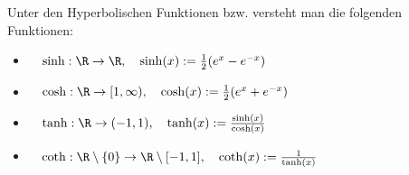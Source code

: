 Unter den Hyperbolischen Funktionen bzw.  versteht man die folgenden Funktionen:
\begin{itemize}[label={},leftmargin=*]
    \item {} $\quad \sinh : \R \to \R, \quad \sinh(x) := \frac{1}{2}(e^x-e^{-x})$
    \item {} $\quad \cosh : \R \to [1, \infty), \quad \cosh(x) := \frac{1}{2}(e^x+e^{-x})$
    \item {} $\quad \tanh : \R \to (-1, 1), \quad \tanh(x) := \frac{\sinh(x)}{\cosh(x)}$
    \item {} $\quad \coth : \R \setminus \{0\} \to \R \setminus [-1, 1], \quad \coth(x) := \frac{1}{\tanh(x)}$
\end{itemize}